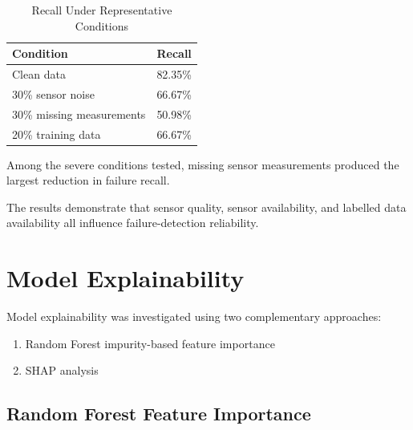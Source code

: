 \documentclass[conference]{IEEEtran}
\begin{document}
\begin{table}[htbp]

\caption{Recall Under Representative Conditions}

\label{tab:summary}

\centering

\begin{tabular}{lc}

\toprule

\textbf{Condition} &
\textbf{Recall}\\

\midrule

Clean data & 82.35\%\\
30\% sensor noise & 66.67\%\\
30\% missing measurements & 50.98\%\\
20\% training data & 66.67\%\\

\bottomrule

\end{tabular}

\end{table}

Among the severe conditions tested, missing sensor measurements produced the largest reduction in failure recall.

The results demonstrate that sensor quality, sensor availability, and labelled data availability all influence failure-detection reliability.


\section{Model Explainability}

Model explainability was investigated using two complementary approaches:

\begin{enumerate}

    \item Random Forest impurity-based feature importance
    \item SHAP analysis

\end{enumerate}

\subsection{Random Forest Feature Importance}
\end{document}
